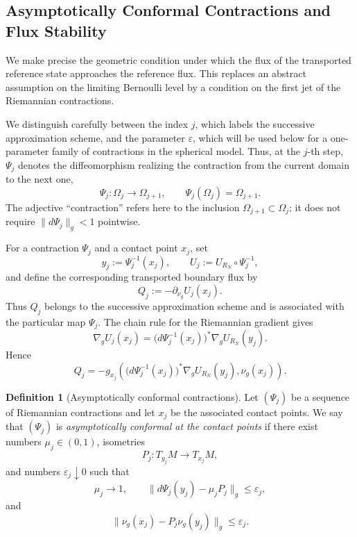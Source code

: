 \documentclass[11pt,a4paper]{article}
\theoremstyle{definition}
\newtheorem{definition}[theorem]{Definition}
\theoremstyle{remark}
\begin{document}
\subsection{Asymptotically Conformal Contractions and Flux Stability}
\label{sec:asymptotically-conformal-contractions}

We make precise the geometric condition under which the flux of the
transported reference state approaches the reference flux. This replaces
an abstract assumption on the limiting Bernoulli level by a condition on
the first jet of the Riemannian contractions.

We distinguish carefully between the index $j$, which labels the
successive approximation scheme, and the parameter $\varepsilon$, which
will be used below for a one-parameter family of contractions in the
spherical model. Thus, at the $j$-th step, $\Psi_j$ denotes the
diffeomorphism realizing the contraction from the current domain to the
next one,
\[
\Psi_j:\Omega_j\longrightarrow\Omega_{j+1},
\qquad
\Psi_j(\Omega_j)=\Omega_{j+1}.
\]
The adjective ``contraction'' refers here to the inclusion
$\Omega_{j+1}\subset\Omega_j$; it does not require
$\|d\Psi_j\|_g<1$ pointwise.

For a contraction $\Psi_j$ and a contact point $x_j$, set
\[
y_j:=\Psi_j^{-1}(x_j),
\qquad
U_j:=U_{R_N}\circ\Psi_j^{-1},
\]
and define the corresponding transported boundary flux by
\begin{equation}
Q_j:=-\partial_{\nu_g}U_j(x_j).
\label{eq:Qj-definition-final}
\end{equation}
Thus $Q_j$ belongs to the successive approximation scheme and is
associated with the particular map $\Psi_j$.
The chain rule for the Riemannian gradient gives
\begin{equation}
\nabla_g U_j(x_j)
=
\bigl(d\Psi_j^{-1}(x_j)\bigr)^*
\nabla_g U_{R_N}(y_j).
\label{eq:transported-gradient-final}
\end{equation}
Hence
\begin{equation}
Q_j
=
-g_{x_j}\!\left(
\bigl(d\Psi_j^{-1}(x_j)\bigr)^*
\nabla_g U_{R_N}(y_j),
\nu_g(x_j)
\right).
\label{eq:transported-flux-final}
\end{equation}

\begin{definition}[Asymptotically conformal contractions]
\label{def:asymptotically-conformal}
Let $(\Psi_j)$ be a sequence of Riemannian contractions and let
$x_j$ be the associated contact points. We say that $(\Psi_j)$ is
\emph{asymptotically conformal at the contact points} if there exist
numbers $\mu_j\in(0,1)$, isometries
\[
P_j:T_{y_j}M\longrightarrow T_{x_j}M,
\]
and numbers $\varepsilon_j\downarrow0$ such that
\begin{equation}
\mu_j\longrightarrow1,
\qquad
\|d\Psi_j(y_j)-\mu_jP_j\|_g
\leq\varepsilon_j,
\label{eq:first-jet-convergence}
\end{equation}
and
\begin{equation}
\|\nu_g(x_j)-P_j\nu_g(y_j)\|_g
\leq\varepsilon_j.
\label{eq:normal-compatibility}
\end{equation}
\end{definition}
\end{document}
